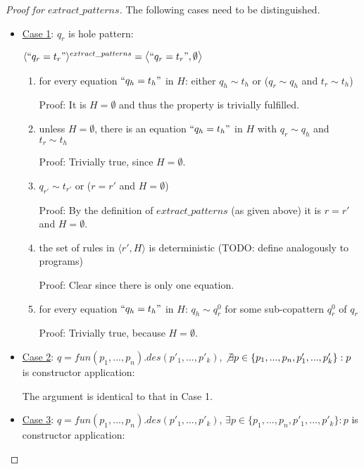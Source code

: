 \documentclass[11pt]{article} %
\begin{document}
\begin{proof}[Proof for $extract\_patterns$] The following cases need to be distinguished.

\begin{itemize}

\item \underline{Case 1}: $q_r$ is hole pattern:

$\langle `` q_r = t_r " \rangle^{extract\_patterns} = \big\langle `` q_r = t_r ", \emptyset \big\rangle$

\begin{enumerate}
\item for every equation $`` q_h = t_h "$ in $H$: either $q_h \sim t_h$ or ($q_r \sim q_h$ and $t_r \sim t_h$)

Proof: It is $H = \emptyset$ and thus the property is trivially fulfilled.

\item unless $H = \emptyset$, there is an equation $`` q_h = t_h "$ in $H$ with $q_r \sim q_h$ and $t_r \sim t_h$

Proof: Trivially true, since $H = \emptyset$.

\item $q_{r'} \sim t_{r'}$ or ($r = r'$ and $H = \emptyset$)

Proof: By the definition of $extract\_patterns$ (as given above) it is $r = r'$ and $H = \emptyset$.

\item the set of rules in $\big\langle r', H \big\rangle$ is deterministic (TODO: define analogously to programs)

Proof: Clear since there is only one equation.

\item for every equation $`` q_h = t_h "$ in $H$: $q_h \sim q^0_r$ for some sub-copattern $q^0_r$ of $q_r$

Proof: Trivially true, because $H = \emptyset$.

\end{enumerate}

\item \underline{Case 2}: $q = fun(p_1, ..., p_n).des(p'_1, ..., p'_k)$, $\not\exists p \in \{ p_1, ..., p_n, p'_1, ..., p'_k \}: p$ is constructor application:

The argument is identical to that in Case 1.

\item \underline{Case 3}: $q = fun(p_1, ..., p_n).des(p'_1, ..., p'_k)$, $\exists p \in \{ p_1, ..., p_n, p'_1, ..., p'_k \}: p$ is constructor application:


\end{itemize}
\end{proof}
\end{document}
